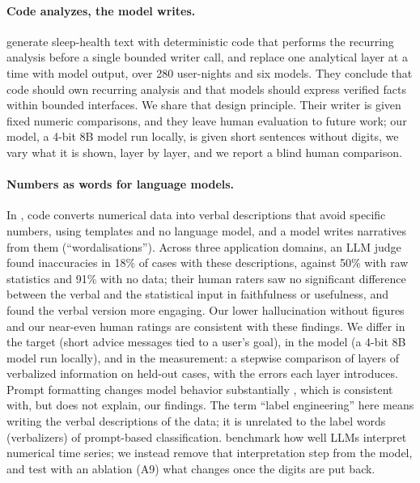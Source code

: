 \documentclass[10pt,twocolumn]{article}
\begin{document}
\paragraph{Code analyzes, the model writes.} \citet{cheng2026thinkfast} generate sleep-health text with
deterministic code that performs the recurring analysis before a single bounded writer call, and replace one
analytical layer at a time with model output, over 280 user-nights and six models. They conclude that code should own
recurring analysis and that models should express verified facts within bounded interfaces. We share that design
principle. Their writer is given fixed numeric comparisons, and they leave human evaluation to future work; our model,
a 4-bit 8B model run locally, is given short sentences without digits, we vary what it is shown, layer by layer, and
we report a blind human comparison.

\paragraph{Numbers as words for language models.} In \citet{caut2025wordalisations}, code converts numerical data
into verbal descriptions that avoid specific numbers, using templates and no language model, and a model writes
narratives from them (``wordalisations''). Across three application domains, an LLM judge found inaccuracies in 18\%
of cases with these descriptions, against 50\% with raw statistics and 91\% with no data; their human raters saw no
significant difference between the verbal and the statistical input in faithfulness or usefulness, and found the
verbal version more engaging. Our lower hallucination without figures and our near-even human ratings are consistent
with these findings. We differ in the target (short advice messages tied to a user's goal), in the model (a 4-bit 8B
model run locally), and in the measurement: a stepwise comparison of layers of verbalized information on held-out
cases, with the errors each layer introduces. Prompt formatting changes model behavior substantially
\citep{sclar2024quantifying}, which is consistent with, but does not explain, our findings. The term ``label engineering''
here means writing the verbal descriptions of the data; it is unrelated to the label words (verbalizers) of prompt-based
classification. \citet{arai2025evaluating} benchmark how well LLMs interpret numerical time series; we instead remove
that interpretation step from the model, and test with an ablation (A9) what changes once the digits are put back.
\end{document}

